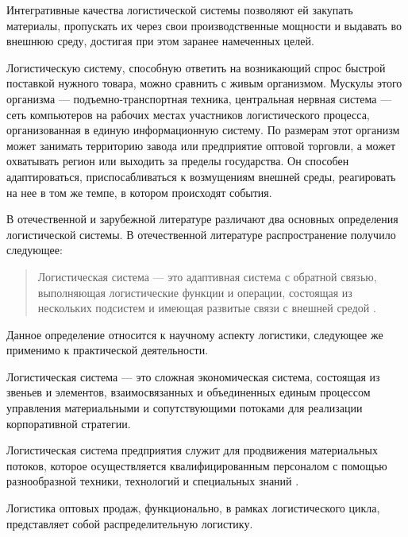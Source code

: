 Интегративные качества логистической системы позволяют ей закупать материалы, пропускать их через свои производственные мощности и выдавать во внешнюю среду, достигая при этом заранее намеченных целей.

Логистическую систему, способную ответить на возни­кающий спрос быстрой поставкой нужного товара, можно сравнить с живым организмом.
Мускулы этого организма --- подъемно-транспортная техника, центральная нервная си­стема --- сеть компьютеров на рабочих местах участников логистического процесса, организованная в единую инфор­мационную систему.
По размерам этот организм может за­нимать территорию завода или предприятие оптовой тор­говли, а может охватывать регион или выходить за преде­лы государства.
Он способен адаптироваться, приспосабли­ваться к возмущениям внешней среды, реагировать на нее в том же темпе, в котором происходят события\cite[с.84--87]{gadzhinskiy}.

В отечественной и зарубежной литературе различают два основных определения логистической системы.
В  отечественной литературе распространение получило следующее:

\begin{quote}
	Логистическая система --- это адаптивная система с обратной связью, выполняющая логистические функции и операции, состоящая из нескольких подсистем и имеющая развитые связи с внешней средой \cite[с. 120]{rodnikov}.
\end{quote}

Данное определение относится к научному аспекту логистики, следующее же применимо к практической деятельности.

Логистическая система --- это сложная экономическая система, состоящая из звеньев и элементов, взаимосвязанных и объединенных единым процессом управления материальными и сопутствующими потоками для реализации корпоративной стратегии.

Логистическая система предприятия служит для продвижения материальных потоков, которое осуществляется квалифицированным персоналом с помощью разнообразной техники, технологий и специальных знаний \cite[с.116]{levkin}.



Логистика оптовых продаж, функционально, в рамках логистического цикла, представляет собой распределительную логистику.


